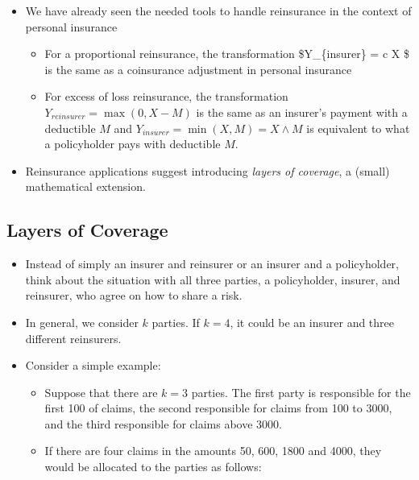 \documentclass[]{book}
\theoremstyle{definition}
\theoremstyle{definition}
\theoremstyle{definition}
\theoremstyle{remark}
\begin{document}
\begin{itemize}
\item
  We have already seen the needed tools to handle reinsurance in the
  context of personal insurance

  \begin{itemize}
  \item
    For a proportional reinsurance, the transformation \$Y\_\{insurer\}
    = c X \$ is the same as a coinsurance adjustment in personal
    insurance
  \item
    For excess of loss reinsurance, the transformation
    \(Y_{reinsurer} = \max(0,X-M)\) is the same as an insurer's payment
    with a deductible \(M\) and \(Y_{insurer} = \min(X,M) = X \wedge M\)
    is equivalent to what a policyholder pays with deductible \(M\).
  \end{itemize}
\item
  Reinsurance applications suggest introducing \emph{layers of
  coverage}, a (small) mathematical extension.
\end{itemize}

\subsection{Layers of Coverage}\label{layers-of-coverage}

\begin{itemize}
\item
  Instead of simply an insurer and reinsurer or an insurer and a
  policyholder, think about the situation with all three parties, a
  policyholder, insurer, and reinsurer, who agree on how to share a
  risk.
\item
  In general, we consider \(k\) parties. If \(k=4\), it could be an
  insurer and three different reinsurers.
\item
  Consider a simple example:

  \begin{itemize}
  \item
    Suppose that there are \(k=3\) parties. The first party is
    responsible for the first 100 of claims, the second responsible for
    claims from 100 to 3000, and the third responsible for claims above
    3000.
  \item
    If there are four claims in the amounts 50, 600, 1800 and 4000, they
    would be allocated to the parties as follows:
  \end{itemize}
\end{itemize}
\end{document}
